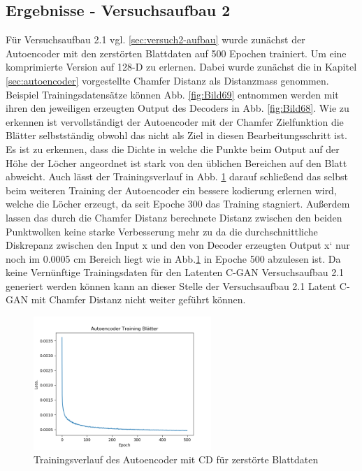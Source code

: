 \documentclass{llncs}
\begin{document}
\subsection{Ergebnisse - Versuchsaufbau 2}

Für Versuchsaufbau 2.1 vgl. \ref{sec:versuch2-aufbau} wurde zunächst der Autoencoder mit den zerstörten Blattdaten auf 500 Epochen trainiert. Um eine komprimierte Version auf 128-D zu erlernen. Dabei wurde zunächst die in Kapitel \ref{sec:autoencoder} vorgestellte Chamfer Distanz als Distanzmass genommen. Beispiel Trainingsdatensätze können  Abb. \ref{fig:Bild69} entnommen werden mit ihren den jeweiligen erzeugten Output des Decoders in Abb. \ref{fig:Bild68}. Wie zu erkennen ist vervollständigt der Autoencoder mit der Chamfer Zielfunktion die Blätter selbstständig obwohl das nicht als Ziel in diesen Bearbeitungsschritt ist. Es ist zu erkennen, dass die Dichte in welche die Punkte beim Output auf der Höhe der Löcher angeordnet ist stark von den üblichen Bereichen auf den Blatt abweicht. Auch lässt der Trainingsverlauf in Abb. \ref{fig:Bild67} darauf schließend das selbst beim weiteren Training der Autoencoder ein bessere kodierung erlernen wird, welche die Löcher erzeugt, da seit Epoche 300 das Training stagniert. Außerdem lassen das durch die Chamfer Distanz berechnete Distanz zwischen den beiden Punktwolken keine starke Verbesserung mehr zu da die durchschnittliche Diskrepanz zwischen den Input x und den von Decoder erzeugten Output x` nur noch im 0.0005 cm Bereich liegt wie in Abb.\ref{fig:Bild67} in Epoche 500 abzulesen ist. Da keine Vernünftige Trainingsdaten für den Latenten C-GAN Versuchsaufbau 2.1 generiert werden können kann an dieser Stelle der Versuchsaufbau 2.1 Latent C-GAN  mit Chamfer Distanz nicht weiter geführt können. 

\begin{figure}[htbp] 
	\centering
	\includegraphics[width=0.6\textwidth]{autoencoder_training_blaetter_result.png}
	\caption{Trainingsverlauf des Autoencoder mit CD für zerstörte Blattdaten}
	\label{fig:Bild67}
\end{figure}
\end{document}
